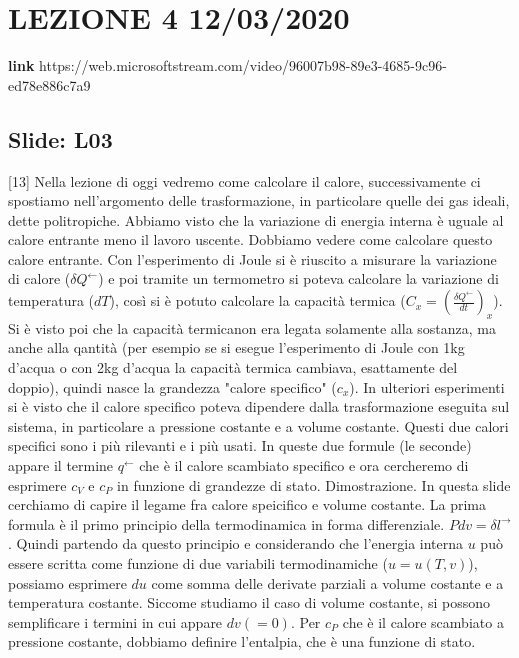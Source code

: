 \section{LEZIONE 4 12/03/2020}
\textbf{link} https://web.microsoftstream.com/video/96007b98-89e3-4685-9c96-ed78e886c7a9
\subsection{Slide: L03}
[13] Nella lezione di oggi vedremo come calcolare il calore, successivamente ci spostiamo nell'argomento delle trasformazione, in particolare quelle dei gas ideali, dette politropiche. Abbiamo visto che la variazione di energia interna è uguale al calore entrante meno il lavoro uscente. Dobbiamo vedere come calcolare questo calore entrante. Con l'esperimento di Joule si è riuscito a misurare la variazione di calore ($\delta Q^\leftarrow $) e poi tramite un termometro si poteva calcolare la variazione di temperatura ($dT$), così si è potuto calcolare la capacità termica ($C_x = \left(\frac{\delta Q^\leftarrow }{dt}\right)_x$). Si è visto poi che la capacità termicanon era legata solamente alla sostanza, ma anche alla qantità (per esempio se si esegue l'esperimento di Joule con 1kg d'acqua o con 2kg d'acqua la capacità termica cambiava, esattamente del doppio), quindi nasce la grandezza "calore specifico" ($c_x$).
\newline[14] In ulteriori esperimenti si è visto che il calore specifico poteva dipendere dalla trasformazione eseguita sul sistema, in particolare a pressione costante e a volume costante. Questi due calori specifici sono i più rilevanti e i più usati. In queste due formule (le seconde) appare il termine $q^\leftarrow $ che è il calore scambiato specifico e ora cercheremo di esprimere $c_V$ e $c_P$ in funzione di grandezze di stato.
\newline[15] Dimostrazione. In questa slide cerchiamo di capire il legame fra calore speicifico e volume costante. La prima formula è il primo principio della termodinamica in forma differenziale. $Pdv = \delta l^\rightarrow $. Quindi partendo da questo principio e considerando che l'energia interna $u$ può essere scritta come funzione di due variabili termodinamiche ($u = u(T,v)$), possiamo esprimere $du$ come somma delle derivate parziali a volume costante e a temperatura costante. Siccome studiamo il caso di volume costante, si possono semplificare i termini in cui appare $dv (=0)$.
\newline[16] Per $c_P$ che è il  calore scambiato a pressione costante, dobbiamo definire l'entalpia, che è una funzione di stato.
